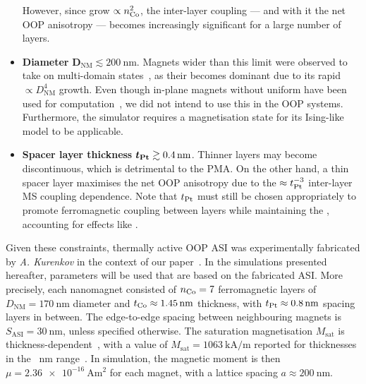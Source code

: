 \begin{itemize}
	However, since  grow $\propto n_{\ce{Co}}^2$, the inter-layer coupling --- and with it the net OOP anisotropy --- becomes increasingly significant for a large number of layers.
	\item \textbf{Diameter} $\boldsymbol{D_\mathrm{NM}} \lesssim \SI{200}{\nano\metre}$. \newline
	Magnets wider than this limit were observed to take on multi-domain states~\cite{KUR-24}, as their  becomes dominant due to its rapid $\propto D_\mathrm{NM}^4$ growth.
	Even though in-plane magnets without uniform  have been used for computation~\cite{gartside2022reconfigurable}, we did not intend to use this in the OOP systems.
	Furthermore, the \hotspice simulator requires a  magnetisation state for its Ising-like model to be applicable. %
	\item \textbf{Spacer layer thickness} $\boldsymbol{t_{\ce{Pt}}} \gtrsim \SI{0.4}{\nano\metre}$. \newline
	Thinner layers may become discontinuous, which is detrimental to the PMA.
	On the other hand, a thin spacer layer maximises the net OOP anisotropy due to the $\approx t_{\ce{Pt}}^{-3}$ inter-layer MS coupling dependence.
	Note that $t_{\ce{Pt}}$ must still be chosen appropriately to promote ferromagnetic coupling between layers while maintaining the , accounting for effects like .
\end{itemize}

Given these constraints, thermally active OOP ASI was experimentally fabricated by \textit{A. Kurenkov} in the context of our paper~\cite{KUR-24}.
In the simulations presented hereafter, parameters will be used that are based on the fabricated ASI.
More precisely, each nanomagnet consisted of $n_{\ce{Co}}=7$ ferromagnetic layers of $D_\mathrm{NM}=\SI{170}{\nano\metre}$ diameter and $t_{\ce{Co}} \approx \SI{1.45}{\nano\metre}$ thickness, with $t_{\ce{Pt}} \approx \SI{0.8}{\nano\metre}$ spacing layers in between.
The edge-to-edge spacing between neighbouring magnets is $S_\mathrm{ASI}=\SI{30}{\nano\metre}$, unless specified otherwise.
The saturation magnetisation $M_\mathrm{sat}$ is thickness-dependent~\cite{CoFilmPropertiesCVD}, with a value of $M_\mathrm{sat}=\SI{1063}{\kilo\ampere\per\metre}$ reported for thicknesses in the \SI{}{\nano\metre} range~\cite{Msat_Co}.
In simulation, the magnetic moment is then $\mu = \SI{2.36e-16}{\ampere\metre\squared}$ for each magnet, with a lattice spacing $a \approx \SI{200}{\nano\metre}$. %

